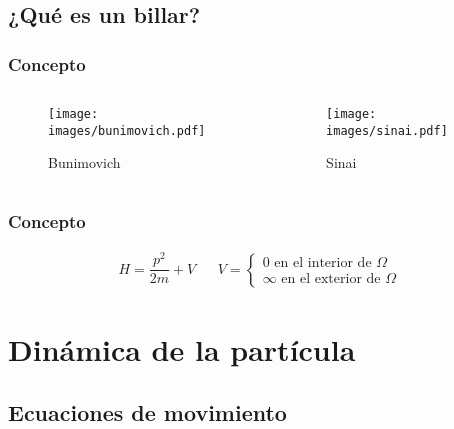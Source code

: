 \documentclass{beamer}
\begin{document}
\subsection{¿Qué es un billar?}

\begin{frame}
    \frametitle[prueb1]{Concepto}
    \begin{columns}
        \begin{column}{0.5\textwidth}
            \begin{figure}
                \texttt{[image: images/bunimovich.pdf]}    
                \caption{Bunimovich}
            \end{figure}  
            
        \end{column}
    
        \begin{column}{0.5\textwidth}
            \begin{figure}
                \texttt{[image: images/sinai.pdf]}
                \caption{Sinai}
            \end{figure}
        \end{column}
        \end{columns}
\end{frame}

\begin{frame}
    \frametitle[prueb1]{Concepto}
    \begin{align*}
        H = \dfrac{p^2}{2m} + V & & V = \begin{cases}
            0 \text{ en el interior de } \Omega \\
            \infty \text{ en el exterior de } \Omega
        \end{cases}
    \end{align*}
\end{frame}

\section{Dinámica de la partícula}
\subsection{Ecuaciones de movimiento}
\end{document}
